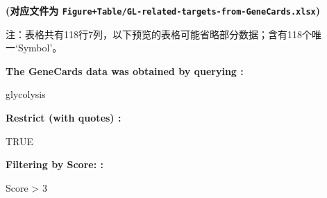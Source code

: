 \documentclass[
]{article}
\begin{document}
\textbf{(对应文件为 \texttt{Figure+Table/GL-related-targets-from-GeneCards.xlsx})}

\begin{center}\begin{tcolorbox}[colback=gray!10, colframe=gray!50, width=0.9\linewidth, arc=1mm, boxrule=0.5pt]注：表格共有118行7列，以下预览的表格可能省略部分数据；含有118个唯一`Symbol'。
\end{tcolorbox}
\end{center}\begin{center}\begin{tcolorbox}[colback=gray!10, colframe=gray!50, width=0.9\linewidth, arc=1mm, boxrule=0.5pt]
\textbf{
The GeneCards data was obtained by querying
:}

\vspace{0.5em}

    glycolysis

\vspace{2em}


\textbf{
Restrict (with quotes)
:}

\vspace{0.5em}

    TRUE

\vspace{2em}


\textbf{
Filtering by Score:
:}

\vspace{0.5em}

    Score > 3

\vspace{2em}
\end{tcolorbox}
\end{center}
\end{document}
